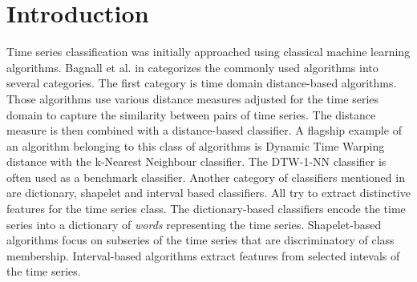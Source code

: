 \documentclass[a4paper,11pt,twoside]{report}
\theoremstyle{definition}
\begin{document}
%
%
%
%
%
\null\thispagestyle{empty}\newpage
\tableofcontents
\thispagestyle{empty}
\newpage %



\null\thispagestyle{empty}\newpage
\pagestyle{fancy}
\setcounter{page}{11}


\chapter{Introduction}
Time series classification was initially approached using classical machine learning algorithms. Bagnall et al. in  \cite{bake_off} categorizes the commonly used algorithms into several categories. The first category is time domain distance-based algorithms. Those algorithms use various distance measures adjusted for the time series domain to capture the similarity between pairs of time series. The distance measure is then combined with a distance-based classifier. A flagship example of an algorithm belonging to this class of algorithms is Dynamic Time Warping distance with the k-Nearest Neighbour classifier. The DTW-1-NN classifier is often used as a benchmark classifier. Another category of classifiers mentioned in \cite{bake_off} are dictionary, shapelet and interval based classifiers. All try to extract distinctive features for the time series class. The dictionary-based classifiers encode the time series into a dictionary of \textit{words} representing the time series. Shapelet-based algorithms focus on subseries of the time series that are discriminatory of class membership. Interval-based algorithms extract features from selected intevals of the time series.
\end{document}
